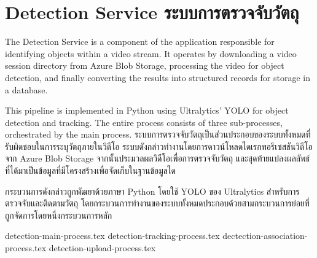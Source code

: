 \section{\ifenglish Detection Service \else ระบบการตรวจจับวัตถุ \fi}
\ifenglish
The Detection Service is a component of the application responsible for identifying objects within a video stream. It operates by downloading a video session directory from Azure Blob Storage, processing the video for object detection, and finally converting the results into structured records for storage in a database. 

This pipeline is implemented in Python using Ultralytics' YOLO for object detection and tracking. The entire process consists of three sub-processes, orchestrated by the main process.
\else
ระบบการตรวจจับวัตถุเป็นส่วนประกอบของระบบทั้งหมดที่รับผิดชอบในการระบุวัตถุภายในวิดีโอ ระบบดังกล่าวทำงานโดยการดาวน์โหลดไดเรกทอรีเซสชันวิดีโอจาก Azure Blob Storage จากนั้นประมวลผลวิดีโอเพื่อการตรวจจับวัตถุ และสุดท้ายแปลงผลลัพธ์ที่ได้มาเป็นข้อมูลที่มีโครงสร้างเพื่อจัดเก็บในฐานข้อมูลได

กระบวนการดังกล่าวถูกพัฒยาด้วยภาษา Python โดยใช้ YOLO ของ Ultralytics สำหรับการตรวจจับและติดตามวัตถุ โดยกระบวนการทำงานของระบบทั้งหมดประกอบด้วยสามกระบวนการย่อยที่ถูกจัดการโดยหนึ่งกระบวนการหลัก
\fi

\newcommand{\detectionDir}{chapters/approach/detection}
{detection-main-process.tex}
{detection-tracking-process.tex}
{dectection-association-process.tex}
{detection-upload-process.tex}
